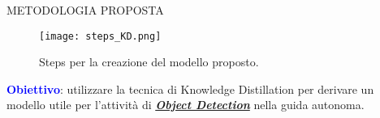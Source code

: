 \begin{frame}{METODOLOGIA PROPOSTA}
    \begin{figure}
        \centering
        \texttt{[image: steps\_KD.png]}
        \centering
        \caption{Steps per la creazione del modello proposto.}
    \end{figure}
    \alert{\textcolor{blue}{\textbf{{Obiettivo}}}}: utilizzare la tecnica di Knowledge Distillation per derivare un 
    modello utile per l'attività di {\bfseries{\emph{\ul{Object Detection}}}} nella guida autonoma.
\end{frame}



